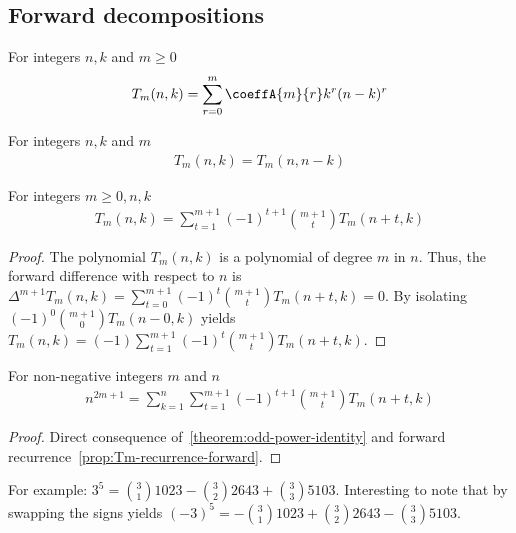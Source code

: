\subsection{Forward decompositions}
\label{subsec:forward-decompositions}
\begin{definition}
    For integers $n,k$ and $m \geq 0$
    \label{def:bivariate-sum-Tm}
    \begin{align*}
        T_{m}(n,k) = \sum_{r=0}^{m} \coeffA{m}{r} k^r (n-k)^r
    \end{align*}
\end{definition}

\begin{proposition}[Symmetry of $T_m$]
    \label{prop:Tm-symmetry}
    For integers $n, k$ and $m$
    \begin{align*}
        T_{m} (n, k) = T_{m} (n, n-k)
    \end{align*}
\end{proposition}
\begin{proposition}
    For integers $m\geq 0, n, k$
    \label{prop:Tm-recurrence-forward}
    \begin{align*}
        T_{m} (n,k) = \sum_{t=1}^{m+1} (-1)^{t+1} \binom{m+1}{t} T_{m} (n+t, k)
    \end{align*}
    \begin{proof}
        The polynomial $T_{m} (n,k)$ is a polynomial of degree $m$ in $n$.
        Thus, the forward difference with respect to $n$ is
        $\Delta^{m+1} T_{m} (n, k) = \sum_{t=0}^{m+1} (-1)^{t} \binom{m+1}{t} T_{m} (n+t, k) = 0$.
        By isolating $(-1)^{0} \binom{m+1}{0} T_{m} (n-0, k)$ yields
        $T_{m} (n, k) = (-1) \sum_{t=1}^{m+1} (-1)^{t} \binom{m+1}{t} T_{m} (n+t, k)$.
    \end{proof}
\end{proposition}

\begin{proposition}
    \label{prop:odd-power-decomposition-forward}
    For non-negative integers $m$ and $n$
    \begin{align*}
        n^{2m+1} = \sum_{k=1}^{n} \sum_{t=1}^{m+1} (-1)^{t+1} \binom{m+1}{t} T_{m} (n+t, k)
    \end{align*}
    \begin{proof}
        Direct consequence of~\eqref{theorem:odd-power-identity}
        and forward recurrence~\eqref{prop:Tm-recurrence-forward}.
    \end{proof}
\end{proposition}
For example: $3^5 = \binom{3}{1} 1023 - \binom{3}{2} 2643 + \binom{3}{3} 5103$.
Interesting to note that by swapping the signs yields
$(-3)^5 = -\binom{3}{1} 1023 + \binom{3}{2} 2643 - \binom{3}{3} 5103$.

